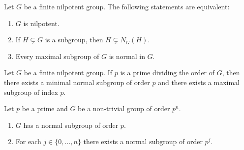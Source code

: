 \begin{exercise}
	\label{xca:normalizadora}
	Let $G$ be a finite nilpotent group. The following statements are equivalent:  
	\begin{enumerate}
		\item $G$ is nilpotent.
		\item If $H\subsetneq G$ is a subgroup, then $H\subsetneq N_G(H)$.
		\item Every maximal subgroup of $G$ is normal in $G$.
	\end{enumerate}
\end{exercise}



\begin{exercise}
	Let $G$ be a finite nilpotent group. If $p$ is a prime dividing the order of $G$, then there
	exists a minimal normal subgroup of order $p$ and there exists a maximal subgroup of index $p$.
\end{exercise}


\begin{exercise}
	\label{xca:pgrupos}
	Let $p$ be a prime and $G$ be a non-trivial group of order $p^n$.
	\begin{enumerate}
		\item $G$ has a normal subgroup of order $p$.
		\item For each $j\in\{0,\dots,n\}$ there exists a normal subgroup of order $p^j$. 
	\end{enumerate}
\end{exercise}

